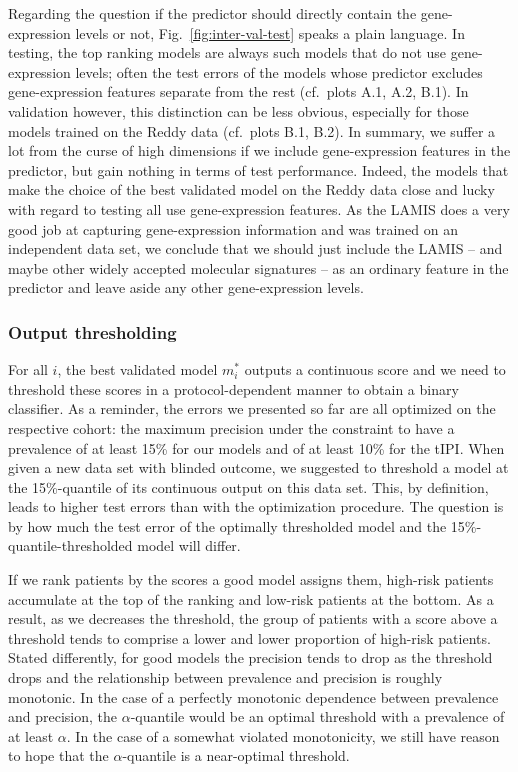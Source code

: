 Regarding the question if the predictor should directly contain the gene-expression levels or not,
Fig.\ \ref{fig:inter-val-test} speaks a plain language. In testing, the top ranking models are 
always such models that do not use gene-expression levels; often the test errors of the models whose 
predictor excludes gene-expression features separate from the rest (cf.\ plots A.1, A.2, B.1). In 
validation however, this distinction can be less obvious, especially for those models trained on 
the Reddy data (cf.\ plots B.1, B.2). In summary, we suffer a lot from the curse of high dimensions 
if we include gene-expression features in the predictor, but gain nothing in terms of test 
performance. Indeed, the models that make the choice of the best validated model on the Reddy data 
close and lucky with regard to testing all use gene-expression features. As the LAMIS does a very 
good job at capturing gene-expression information and was trained on an independent data set, we 
conclude that we should just include the LAMIS -- and maybe other widely accepted molecular 
signatures -- as an ordinary feature in the predictor and leave aside any other gene-expression 
levels.

\subsubsection{Output thresholding}




For all $i$, the best validated model $m_i^*$ outputs a continuous score and we need to threshold 
these scores in a protocol-dependent manner to obtain a binary classifier. As a reminder, the errors 
we presented so far are all optimized on the respective cohort: the maximum precision under the 
constraint to have a prevalence of at least \num{15}\% for our models and of at least \num{10}\% 
for the tIPI. When given a new data set with blinded outcome, we suggested to threshold a model at 
the \num{15}\%-quantile of its continuous output on this data set. This, by definition, leads to 
higher test errors than with the optimization procedure. The question is by how much the test error 
of the optimally thresholded model and the \num{15}\%-quantile-thresholded model will differ.

If we rank patients by the scores a good model assigns them, high-risk patients accumulate at the 
top of the ranking and low-risk patients at the bottom. As a result, as we decreases the threshold, 
the group of patients with a score above a threshold tends to comprise a lower and lower proportion 
of high-risk patients. Stated differently, for good models the precision tends to drop as the 
threshold drops and the relationship between prevalence and precision is roughly monotonic. In the 
case of a perfectly monotonic dependence between prevalence and precision, the $\alpha$-quantile 
would be an optimal threshold with a prevalence of at least $\alpha$. 
In the case of a somewhat violated monotonicity, we still have reason to hope that the 
$\alpha$-quantile is a near-optimal threshold.

